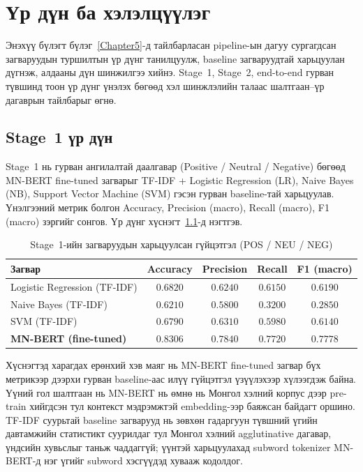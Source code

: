 
\chapter{Үр дүн ба хэлэлцүүлэг}
\label{Chapter6}

Энэхүү бүлэгт бүлэг~\ref{Chapter5}-д тайлбарласан pipeline-ын дагуу сургагдсан
загваруудын туршилтын үр дүнг танилцуулж, baseline загваруудтай харьцуулан
дүгнэж, алдааны дүн шинжилгээ хийнэ. Stage~1, Stage~2, end-to-end гурван
түвшинд тоон үр дүнг үнэлэх бөгөөд хэл шинжлэлийн талаас шалтгаан--үр дагаврын
тайлбарыг өгнө.

\section{Stage~1 үр дүн}
\label{sec:stage1-results}

Stage~1 нь гурван ангилалтай даалгавар (Positive / Neutral / Negative) бөгөөд
MN-BERT fine-tuned загварыг TF-IDF + Logistic Regression (LR), Naive Bayes (NB),
Support Vector Machine (SVM) гэсэн гурван baseline-тай харьцуулав. Үнэлгээний
метрик болгон Accuracy, Precision (macro), Recall (macro), F1 (macro) зэргийг
сонгов. Үр дүнг хүснэгт~\ref{tab:stage1-final}-д нэгтгэв.

\begin{table}[H]
\centering
\caption{Stage~1-ийн загваруудын харьцуулсан гүйцэтгэл (POS / NEU / NEG)}
\label{tab:stage1-final}
\begin{tabular}{@{}lcccc@{}}
\toprule
\textbf{Загвар} & \textbf{Accuracy} & \textbf{Precision} & \textbf{Recall} & \textbf{F1 (macro)} \\
\midrule
Logistic Regression (TF-IDF)         & $0.6820$ & $0.6240$ & $0.6150$ & $0.6190$ \\
Naive Bayes (TF-IDF)                & $0.6210$ & $0.5800$ & $0.3200$ & $0.2850$ \\
SVM (TF-IDF)                        & $0.6790$ & $0.6310$ & $0.5980$ & $0.6140$ \\
\textbf{MN-BERT (fine-tuned)}        & $\mathbf{0.8306}$ & $\mathbf{0.7840}$ & $\mathbf{0.7720}$ & $\mathbf{0.7778}$ \\
\bottomrule
\end{tabular}
\end{table}

Хүснэгтэд харагдах ерөнхий хэв маяг нь MN-BERT fine-tuned загвар бүх метрикээр
дээрхи гурван baseline-аас илүү гүйцэтгэл үзүүлэхээр хүлээгдэж байна. Үүний гол
шалтгаан нь MN-BERT нь өмнө нь Монгол хэлний корпус дээр pre-train хийгдсэн
тул контекст мэдрэмжтэй embedding-ээр баяжсан байдагт оршино. TF-IDF суурьтай
baseline загварууд нь зөвхөн гадаргуун түвшний үгийн давтамжийн статистикт
суурилдаг тул Монгол хэлний agglutinative дагавар, үндсийн хувьслыг таньж
чаддаггүй; үүнтэй харьцуулахад subword tokenizer MN-BERT-д нэг үгийг
subword хэсгүүдэд хувааж кодолдог.

